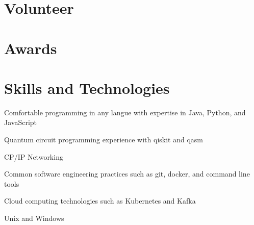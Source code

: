 \documentclass[11pt,a4paper,sans]{moderncv}        %
\begin{document}
\section{Volunteer}

\section{Awards}

\section{Skills and Technologies}
Comfortable programming in any langue with expertise in Java, Python, and JavaScript

Quantum circuit programming experience with qiskit and qasm

CP/IP Networking

Common software engineering practices such as git, docker, and command line tools

Cloud computing technologies such as Kubernetes and Kafka 

Unix and Windows
\end{document}

